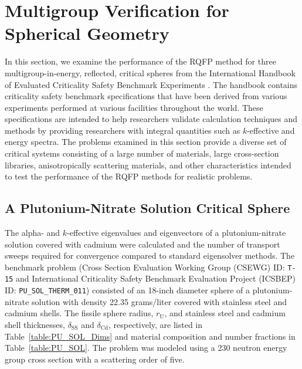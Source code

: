 \section{Multigroup Verification for Spherical Geometry}

In this section, we examine the performance of the RQFP method for three multigroup-in-energy, reflected, critical spheres from the International Handbook of Evaluated Criticality Safety Benchmark Experiments \cite{bess2015international}. The handbook contains criticality safety benchmark specifications that have been derived from various experiments performed at various facilities throughout the world. These specifications are intended to help researchers validate calculation techniques and methods by providing researchers with integral quantities such as $k$-effective and energy spectra. The problems examined in this section provide a diverse set of critical systems consisting of a large number of materials, large cross-section libraries, anisotropically scattering materials, and other characteristics intended to test the performance of the RQFP methods for realistic problems.

\subsection{A Plutonium-Nitrate Solution Critical Sphere}

The alpha- and $k$-effective eigenvalues and eigenvectors of a plutonium-nitrate solution covered with cadmium were calculated and the number of transport sweeps required for convergence compared to standard eigensolver methods. The benchmark problem (Cross Section Evaluation Working Group (CSEWG) ID: \texttt{T-15} and International Criticality Safety Benchmark Evaluation Project (ICSBEP) ID: \texttt{PU\_SOL\_THERM\_011}) consisted of an 18-inch diameter sphere of a plutonium-nitrate solution with density 22.35 grams/liter covered with stainless steel and cadmium shells. The fissile sphere radius, $r_{\text{U}}$, and stainless steel and cadmium shell thicknesses, $\delta_{\text{SS}}$ and $\delta_{\text{Cd}}$, respectively, are listed in Table~\ref{table:PU_SOL_Dims} and material composition and number fractions in Table~\ref{table:PU_SOL}. The problem was modeled using a 230 neutron energy group cross section with a scattering order of five. 


